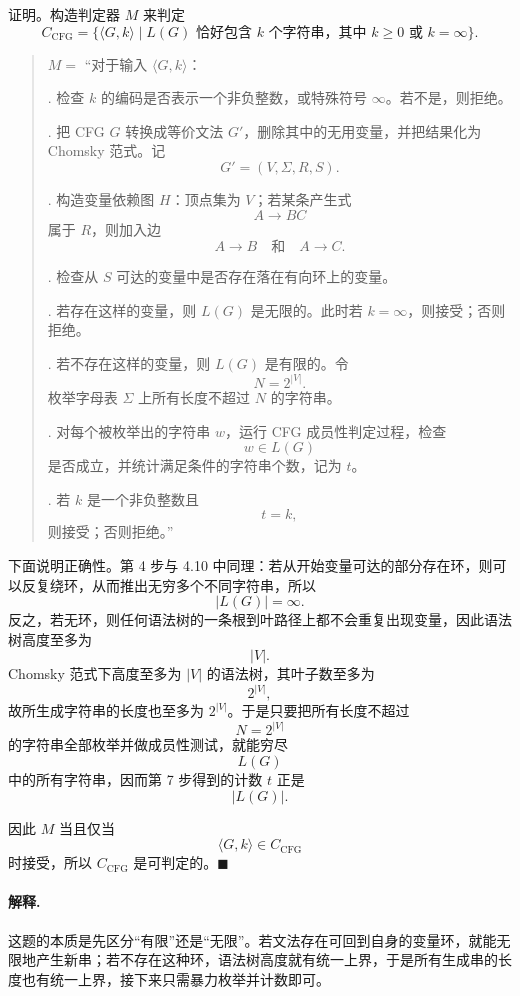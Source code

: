 \begin{answerred}
证明。构造判定器 $M$ 来判定
\[
    C_{\mathrm{CFG}}
    =\{\langle G,k\rangle\mid L(G)\text{ 恰好包含 }k\text{ 个字符串，其中 }k\ge 0\text{ 或 }k=\infty\}.
\]

\begin{quote}
$M=$ ``对于输入 $\langle G,k\rangle$：

\medskip
{}. 检查 $k$ 的编码是否表示一个非负整数，或特殊符号 $\infty$。若不是，则拒绝。

\medskip
{}. 把 CFG $G$ 转换成等价文法 $G'$，删除其中的无用变量，并把结果化为 Chomsky 范式。记
\[
    G'=(V,\Sigma,R,S).
\]

\medskip
{}. 构造变量依赖图 $H$：顶点集为 $V$；若某条产生式
\[
    A\to BC
\]
属于 $R$，则加入边
\[
    A\to B
    \quad\text{和}\quad
    A\to C.
\]

\medskip
{}. 检查从 $S$ 可达的变量中是否存在落在有向环上的变量。

\medskip
{}. 若存在这样的变量，则 $L(G)$ 是无限的。此时若 $k=\infty$，则接受；否则拒绝。

\medskip
{}. 若不存在这样的变量，则 $L(G)$ 是有限的。令
\[
    N=2^{|V|}.
\]
枚举字母表 $\Sigma$ 上所有长度不超过 $N$ 的字符串。

\medskip
{}. 对每个被枚举出的字符串 $w$，运行 CFG 成员性判定过程，检查
\[
    w\in L(G)
\]
是否成立，并统计满足条件的字符串个数，记为 $t$。

\medskip
{}. 若 $k$ 是一个非负整数且
\[
    t=k,
\]
则接受；否则拒绝。''
\end{quote}

\medskip
下面说明正确性。第 4 步与 4.10 中同理：若从开始变量可达的部分存在环，则可以反复绕环，从而推出无穷多个不同字符串，所以
\[
    |L(G)|=\infty.
\]
反之，若无环，则任何语法树的一条根到叶路径上都不会重复出现变量，因此语法树高度至多为
\[
    |V|.
\]
Chomsky 范式下高度至多为 $|V|$ 的语法树，其叶子数至多为
\[
    2^{|V|},
\]
故所生成字符串的长度也至多为 $2^{|V|}$。于是只要把所有长度不超过
\[
    N=2^{|V|}
\]
的字符串全部枚举并做成员性测试，就能穷尽
\[
    L(G)
\]
中的所有字符串，因而第 7 步得到的计数 $t$ 正是
\[
    |L(G)|.
\]

\medskip
因此 $M$ 当且仅当
\[
    \langle G,k\rangle\in C_{\mathrm{CFG}}
\]
时接受，所以 $C_{\mathrm{CFG}}$ 是可判定的。$\blacksquare$

\begin{answernote}
\paragraph{解释.}
这题的本质是先区分“有限”还是“无限”。若文法存在可回到自身的变量环，就能无限地产生新串；若不存在这种环，语法树高度就有统一上界，于是所有生成串的长度也有统一上界，接下来只需暴力枚举并计数即可。
\end{answernote}
\end{answerred}

\clearpage
